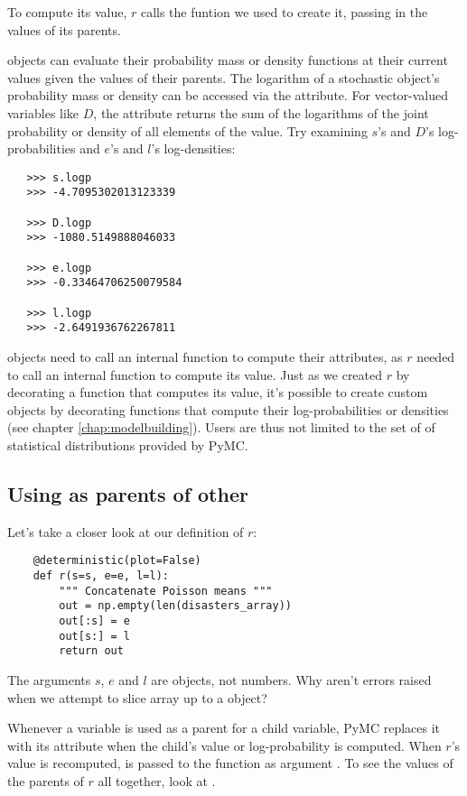 To compute its value, $r$ calls the funtion we used to create it, passing in the values of its parents.

 objects can evaluate their probability mass or density functions at their current values given the values of their parents. The logarithm of a stochastic object's probability mass or density can be accessed via the  attribute. For vector-valued variables like $D$, the  attribute returns the sum of the logarithms of the joint probability or density of all elements of the value. Try examining $s$'s and $D$'s log-probabilities and $e$'s and $l$'s log-densities:
\begin{verbatim}
   >>> s.logp
   >>> -4.7095302013123339

   >>> D.logp
   >>> -1080.5149888046033

   >>> e.logp
   >>> -0.33464706250079584

   >>> l.logp
   >>> -2.6491936762267811
\end{verbatim}
 objects need to call an internal function to compute their  attributes, as $r$ needed to call an internal function to compute its value. Just as we created $r$ by decorating a function that computes its value, it's possible to create custom  objects by decorating functions that compute their log-probabilities or densities (see chapter \ref{chap:modelbuilding}). Users are thus not limited to the set of of statistical distributions provided by PyMC.

\subsection[Using Variables as parents of other Variables]{Using
 as parents of other }

Let's take a closer look at our definition of $r$:
\begin{verbatim}
	@deterministic(plot=False)
	def r(s=s, e=e, l=l):
	    """ Concatenate Poisson means """
	    out = np.empty(len(disasters_array))
	    out[:s] = e
	    out[s:] = l
	    return out
\end{verbatim}
The arguments $s$, $e$ and $l$ are  objects, not numbers. Why aren't errors raised when we attempt to slice array  up to a  object?

Whenever a variable is used as a parent for a child variable, PyMC replaces it with its  attribute when the child's value or log-probability is computed. When $r$'s value is recomputed,  is passed to the function as argument . To see the values of the parents of $r$ all together, look at .

